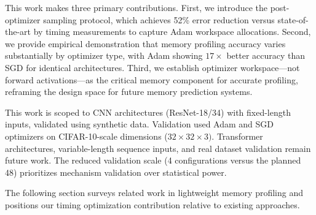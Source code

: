 This work makes three primary contributions. First, we introduce the post-optimizer sampling protocol, which achieves 52\% error reduction versus state-of-the-art by timing measurements to capture Adam workspace allocations. Second, we provide empirical demonstration that memory profiling accuracy varies substantially by optimizer type, with Adam showing $17\times$ better accuracy than SGD for identical architectures. Third, we establish optimizer workspace---not forward activations---as the critical memory component for accurate profiling, reframing the design space for future memory prediction systems.

This work is scoped to CNN architectures (ResNet-18/34) with fixed-length inputs, validated using synthetic data. Validation used Adam and SGD optimizers on CIFAR-10-scale dimensions ($32\times 32\times 3)$. Transformer architectures, variable-length sequence inputs, and real dataset validation remain future work. The reduced validation scale (4 configurations versus the planned 48) prioritizes mechanism validation over statistical power.

The following section surveys related work in lightweight memory profiling and positions our timing optimization contribution relative to existing approaches.

